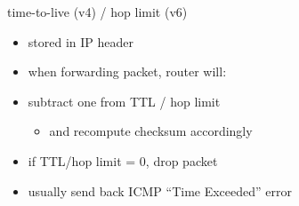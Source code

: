 \begin{frame}{time-to-live (v4) / hop limit (v6)}
    \begin{itemize}
    \item stored in IP header 
    \vspace{.5cm}
    \item when forwarding packet, router will:
    \item subtract one from TTL / hop limit
        \begin{itemize}
        \item and recompute checksum accordingly
        \end{itemize}
    \item if TTL/hop limit = 0, drop packet
    \item usually send back ICMP ``Time Exceeded'' error
    \end{itemize}
\end{frame}

